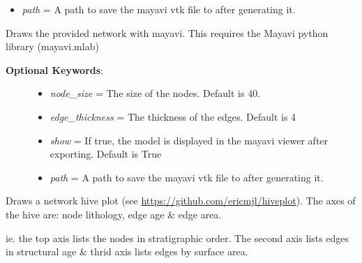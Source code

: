 \documentclass[a4paper,10pt,english]{sphinxmanual}
\begin{document}
\begin{fulllineitems}
\begin{fulllineitems}
\begin{description}
\begin{itemize}
\item {} 
\emph{path} = A path to save the mayavi vtk file to after generating it.

\end{itemize}

\end{description}

\end{fulllineitems}


\begin{fulllineitems}
\label{pynoddy:pynoddy.output.NoddyTopology.draw_mayavi_graph}
Draws the provided network with mayavi. This requires the Mayavi python library
(mayavi.mlab)
\begin{description}
\item[{\textbf{Optional Keywords}:}] \leavevmode\begin{itemize}
\item {} 
\emph{node\_size} = The size of the nodes. Default is 40.

\item {} 
\emph{edge\_thickness} = The thickness of the edges. Default is 4

\item {} 
\emph{show} = If true, the model is displayed in the mayavi viewer after exporting. Default is True

\item {} 
\emph{path} = A path to save the mayavi vtk file to after generating it.

\end{itemize}

\end{description}

\end{fulllineitems}


\begin{fulllineitems}
\label{pynoddy:pynoddy.output.NoddyTopology.draw_network_hive}
Draws a network hive plot (see \href{https://github.com/ericmjl/hiveplot}{https://github.com/ericmjl/hiveplot}).
The axes of the hive are: node lithology, edge age \& edge area.

ie. the top axis lists the nodes in stratigraphic order. The second axis
lists edges in structural age \& thrid axis lists edges by surface area.


\end{fulllineitems}
\end{fulllineitems}
\end{document}
